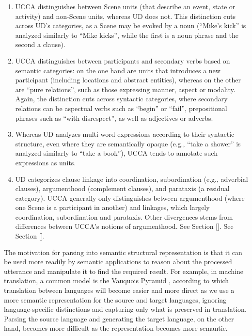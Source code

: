 \documentclass[11pt,a4paper]{article}
\begin{document}
  \begin{enumerate}
    \item 
      UCCA distinguishes between Scene units (that describe an event, state or activity) and non-Scene units, whereas
      UD does not. This distinction cuts across UD's categories, as a Scene may be evoked by a noun (``Mike's kick'' is analyzed
      similarly to ``Mike kicks'', while the first is a noun phrase and the second a clause). 
    \item
      UCCA distinguishes between participants and secondary verbs based on semantic categories: on the one hand are units that introduces a new
      participant (including locations and abstract entities), whereas on the other are ``pure relations'', such as those expressing manner,
      aspect or modality. Again, the distinction cuts across syntactic categories, where secondary relations can be aspectual verbs such
      as ``begin'' or ``fail'', prepositional phrases such as ``with disrespect'', as well as adjectives or adverbs. 
    \item
      Whereas UD analyzes multi-word expressions
			according to their syntactic structure, even where they are semantically opaque (e.g., ``take a shower'' is analyzed
			similarly to ``take a book''), UCCA tends to annotate such expressions as units. 
		\item
			UD categorizes clause linkage into coordination, subordination (e.g., adverbial clauses), argumenthood (complement clauses),
			and parataxis (a residual category). UCCA generally only distinguishes between argumenthood (where one Scene is
			a participant in another) and linkages, which largely coordination, subordination and parataxis. 
			Other divergences stems from differences between UCCA's notions of argumenthood. See Section \ref{}.
			See Section \ref{}.
  \end{enumerate}
  

  The motivation for parsing into semantic structural representation is that it can be used more readily
  by semantic applications to reason about the processed utterance and manipulate it to find the required
  result.
  For example, in machine translation, a common model is the Vauquois Pyramid 
  \cite{vauquois1968survey},
  according to which translation between languages will become easier and more direct as we use
  a more semantic representation for the source and target languages,
  ignoring language-specific distinctions and capturing only what is preserved in translation.
  Parsing the source language and generating the target language, on the other hand, becomes more
  difficult as the representation becomes more semantic.
\end{document}
